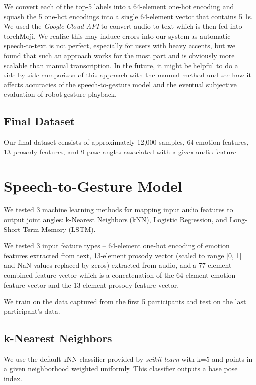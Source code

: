 We convert each of the top-5 labels into a 64-element one-hot encoding and squash the 5 one-hot encodings into a single 64-element vector that contains 5 1s. We used the \textit{Google Cloud API} \cite{gcloud} to convert audio to text which is then fed into torchMoji. We realize this may induce errors into our system as automatic speech-to-text is not perfect, especially for users with heavy accents, but we found that such an approach works for the most part and is obviously more scalable than manual transcription. In the future, it might be helpful to do a side-by-side comparison of this approach with the manual method and see how it affects accuracies of the speech-to-gesture model and the eventual subjective evaluation of robot gesture playback.

\subsection{Final Dataset}

Our final dataset consists of approximately 12,000 samples, 64 emotion features, 13 prosody features, and 9 pose angles associated with a given audio feature.


\section{Speech-to-Gesture Model}
We tested 3 machine learning methods for mapping input audio features to output joint angles: k-Nearest Neighbors (kNN), Logistic Regression, and Long-Short Term Memory (LSTM).

We tested 3 input feature types -- 64-element one-hot encoding of emotion features extracted from text, 13-element prosody vector (scaled to range [0, 1] and NaN values replaced by zeros) extracted from audio, and a 77-element combined feature vector which is a concatenation of the 64-element emotion feature vector and the 13-element prosody feature vector.

We train on the data captured from the first 5 participants and test on the last participant's data.

\subsection{k-Nearest Neighbors}
We use the default kNN classifier provided by \textit{scikit-learn} \cite{sklearn} with k=5 and points in a given neighborhood weighted uniformly. This classifier outputs a base pose index.

